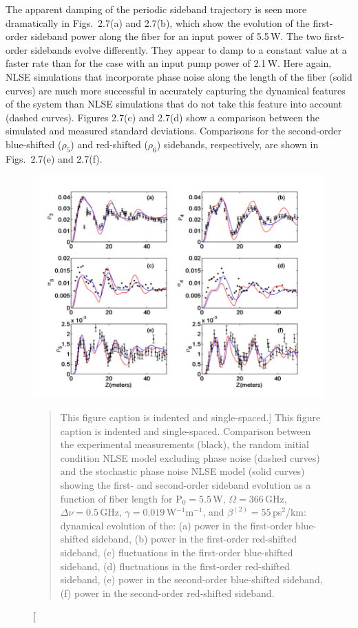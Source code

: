 The apparent damping of the periodic sideband trajectory is seen more
dramatically in Figs.\ 2.7(a) and 2.7(b), which show the evolution of the
first-order sideband power along the fiber for an input power of 5.5\,W.
The two first-order sidebands evolve differently. They appear to
damp to a constant value at a faster rate than for the case with an input pump
power of 2.1\,W. Here again, NLSE simulations that incorporate phase noise along the length
of the fiber (solid curves) are much more successful in accurately capturing the dynamical features of the system than NLSE simulations that do not take this feature into account (dashed curves).  Figures 2.7(c) and 2.7(d) show a comparison between the simulated and measured standard deviations. Comparisons for the second-order blue-shifted ($\rho_5$) and red-shifted ($\rho_6$) sidebands, respectively, are shown in Figs.\ 2.7(e) and 2.7(f).


\begin{figure}
\begin{center}
\includegraphics[width=5in]{nlsez55phaseornot.pdf}
\end{center}
\renewcommand{\baselinestretch}{1}
\small\normalsize
\begin{quote}
\caption
[This figure caption is indented and single-spaced.]
{This figure caption is indented and single-spaced.  Comparison between the experimental measurements \cite{hart1} (black), the random initial condition NLSE model excluding phase noise (dashed curves) and the stochastic phase noise NLSE model (solid curves) showing the first- and second-order sideband evolution as a function of fiber length for P$_{0} = 5.5$\,W, $\Omega = 366$\,GHz, $\Delta\nu = 0.5$\,GHz, $\gamma = 0.019$\,W$^{-1}$m$^{-1}$, and $\beta^{(2)} = 55$\,ps$^2$/km: dynamical evolution of the: (a) power in the first-order blue-shifted sideband, (b) power in the first-order red-shifted sideband, (c) fluctuations in the first-order blue-shifted sideband, (d) fluctuations in the first-order red-shifted sideband, (e) power in the second-order blue-shifted sideband, (f) power in the second-order red-shifted sideband.}
\label{fig2.7}
\end{quote}
\end{figure}
\renewcommand{\baselinestretch}{2}
\small\normalsize

